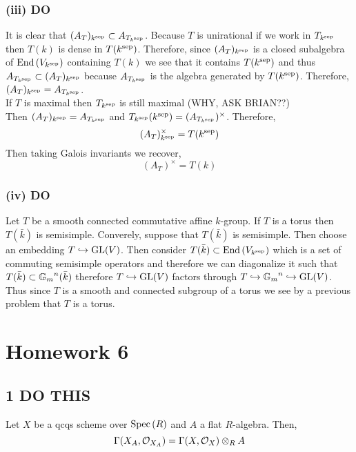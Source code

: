 \documentclass[12pt]{article}
\begin{document}
\subsubsection{(iii) DO}

It is clear that $(A_T)_{k^{\mathrm{sep}}} \subset A_{T_{k^{\mathrm{sep}}}}$. Because $T$ is unirational if we work in $T_{k^{\mathrm{sep}}}$ then $T(k)$ is dense in $T(k^{\mathrm{sep}})$. Therefore, since $(A_T)_{k^{\mathrm{sep}}}$ is a closed subalgebra of $\mathrm{End}\left( V_{k^{\mathrm{sep}}} \right)$ containing $T(k)$ we see that it contains $T(k^{\mathrm{sep}})$ and thus $A_{T_{k^{\mathrm{sep}}}} \subset (A_T)_{k^{\mathrm{sep}}}$ because $A_{T_{k^{\mathrm{sep}}}}$ is the algebra generated by $T(k^{\mathrm{sep}})$. Therefore, $(A_T)_{k^{\mathrm{sep}}} = A_{T_{k^{\mathrm{sep}}}}$.
\bigskip\\
If $T$ is maximal then $T_{k^{\mathrm{sep}}}$ is still maximal  (WHY, ASK BRIAN??)
\bigskip\\
Then $(A_T)_{k^{\mathrm{sep}}} = A_{T_{k^{\mathrm{sep}}}}$ and $T_{k^{\mathrm{sep}}}(k^{\mathrm{sep}}) = (A_{T_{k^{\mathrm{sep}}}})^\times$. Therefore,
\[ (A_T)^\times_{k^{\mathrm{sep}}} = T(k^{\mathrm{sep}}) \]
Then taking Galois invariants we recover,
\[ (A_T)^\times = T(k) \]


\subsubsection{(iv) DO}

Let $T$ be a smooth connected commutative affine $k$-group. If $T$ is a torus then $T(\bar{k})$ is semisimple. Converely, suppose that $T(\bar{k})$ is semisimple. Then choose an embedding $T \hookrightarrow \mathrm{GL}(V)$. Then consider $T(\bar{k}) \subset \mathrm{End}\left( V_{k^{\mathrm{sep}}} \right)$ which is a set of commuting semisimple operators and therefore we can diagonalize it such that $T(\bar{k}) \subset {\mathbb{G}_m}^n(\bar{k})$ therefore $T \hookrightarrow \mathrm{GL}(V)$ factors through $T \hookrightarrow {\mathbb{G}_m}^n \hookrightarrow \mathrm{GL}(V)$. Thus since $T$ is a smooth and connected subgroup of a torus we see by a previous problem that $T$ is a torus.

\section{Homework 6}

\subsection{1 DO THIS}

\begin{lemma}
Let $X$ be a qcqs scheme over $\mathrm{Spec}\left( R \right)$ and $A$ a flat $R$-algebra. Then,
\[ \Gamma(X_A, \mathcal{O}_{X_A}) = \Gamma(X, \mathcal{O}_{X}) \otimes_R A \]
\end{lemma}
\end{document}
